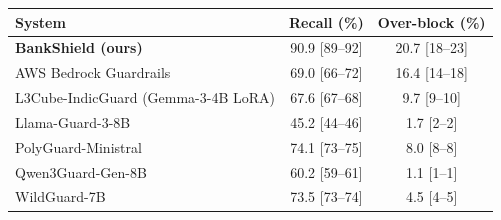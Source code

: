 \begin{tabular}{lcc}
\toprule
System & Recall (\%) & Over-block (\%) \\
\midrule
\textbf{BankShield (ours)} & 90.9 {\footnotesize[89--92]} & 20.7 {\footnotesize[18--23]} \\
AWS Bedrock Guardrails & 69.0 {\footnotesize[66--72]} & 16.4 {\footnotesize[14--18]} \\
L3Cube-IndicGuard (Gemma-3-4B LoRA) & 67.6 {\footnotesize[67--68]} & 9.7 {\footnotesize[9--10]} \\
Llama-Guard-3-8B & 45.2 {\footnotesize[44--46]} & 1.7 {\footnotesize[2--2]} \\
PolyGuard-Ministral & 74.1 {\footnotesize[73--75]} & 8.0 {\footnotesize[8--8]} \\
Qwen3Guard-Gen-8B & 60.2 {\footnotesize[59--61]} & 1.1 {\footnotesize[1--1]} \\
WildGuard-7B & 73.5 {\footnotesize[73--74]} & 4.5 {\footnotesize[4--5]} \\
\bottomrule
\end{tabular}